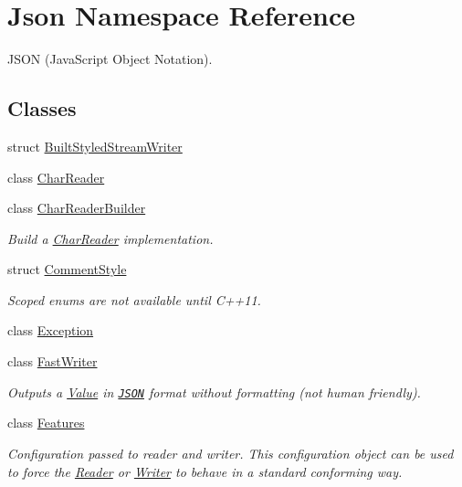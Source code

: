 \hypertarget{namespace_json}{}\section{Json Namespace Reference}
\label{namespace_json}


J\+S\+ON (Java\+Script Object Notation).  


\subsection*{Classes}
\begin{DoxyCompactItemize}
\item 
struct \hyperlink{struct_json_1_1_built_styled_stream_writer}{Built\+Styled\+Stream\+Writer}
\item 
class \hyperlink{class_json_1_1_char_reader}{Char\+Reader}
\item 
class \hyperlink{class_json_1_1_char_reader_builder}{Char\+Reader\+Builder}
\begin{DoxyCompactList}\small\item\em Build a \hyperlink{class_json_1_1_char_reader}{Char\+Reader} implementation. \end{DoxyCompactList}\item 
struct \hyperlink{struct_json_1_1_comment_style}{Comment\+Style}
\begin{DoxyCompactList}\small\item\em Scoped enums are not available until C++11. \end{DoxyCompactList}\item 
class \hyperlink{class_json_1_1_exception}{Exception}
\item 
class \hyperlink{class_json_1_1_fast_writer}{Fast\+Writer}
\begin{DoxyCompactList}\small\item\em Outputs a \hyperlink{class_json_1_1_value}{Value} in \href{http://www.json.org}{\tt J\+S\+ON} format without formatting (not human friendly). \end{DoxyCompactList}\item 
class \hyperlink{class_json_1_1_features}{Features}
\begin{DoxyCompactList}\small\item\em Configuration passed to reader and writer. This configuration object can be used to force the \hyperlink{class_json_1_1_reader}{Reader} or \hyperlink{class_json_1_1_writer}{Writer} to behave in a standard conforming way. \end{DoxyCompactList}\item 

\end{DoxyCompactItemize}
